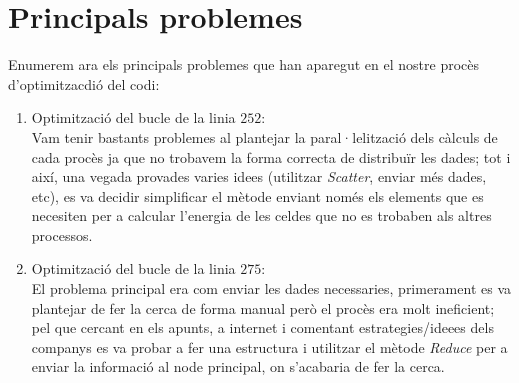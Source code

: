 \documentclass[a4paper, 11pt]{article}
\begin{document}
\section{Principals problemes}
Enumerem ara els principals problemes que han aparegut en el nostre procès d'optimitzacdió del codi:
\begin{enumerate}
    \item Optimització del bucle de la linia $252$: \\
    Vam tenir bastants problemes al plantejar la paral·lelització dels càlculs de cada procès ja que no trobavem la forma correcta de distribuïr les dades; tot i així, una vegada provades varies idees (utilitzar \textit{Scatter}, enviar més dades, etc), es va decidir simplificar el mètode enviant només els elements que es necesiten per a calcular l'energia de les celdes que no es trobaben als altres processos.
    \item Optimització del bucle de la linia $275$:\\
    El problema principal era com enviar les dades necessaries, primerament es va plantejar de fer la cerca de forma manual però el procès era molt ineficient; pel que cercant en els apunts, a internet i comentant estrategies/ideees dels companys es va probar a fer una estructura i utilitzar el mètode \textit{Reduce} per a enviar la informació al node principal, on s'acabaria de fer la cerca.
\end{enumerate}
\end{document}
